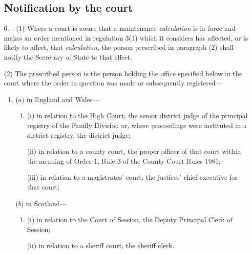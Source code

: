 \documentclass[12pt,a4paper]{article}
\begin{document}
\subsection[6. Notification by the court]{Notification by the court}

6.—(1) Where a court is aware that a maintenance 
\emph{calculation} 
is in force and makes an order mentioned in regulation 3(1) which it considers has affected, or is likely to affect, that 
\emph{calculation}, 
the person prescribed in paragraph (2) shall notify the Secretary of State to that effect.

(2) The prescribed person is the person holding the office specified below in the court where the order in question was made or subsequently registered—
\begin{enumerate}\item[]
($a$) in England and Wales—
\begin{enumerate}\item[]
(i) in relation to the High Court, the senior district judge of the principal registry of the Family Division or, where proceedings were instituted in a district registry, the district judge;

(ii) in relation to a county court, the proper officer of that court within the meaning of Order 1, Rule 3 of the County Court Rules 1981;

(iii) in relation to a magistrates' court, the 
justices' chief executive for  %
that court;
\end{enumerate}

($b$) in Scotland—
\begin{enumerate}\item[]
(i) in relation to the Court of Session, the Deputy Principal Clerk of Session;

(ii) in relation to a sheriff court, the sheriff clerk.
\end{enumerate}
\end{enumerate}

\end{document}
